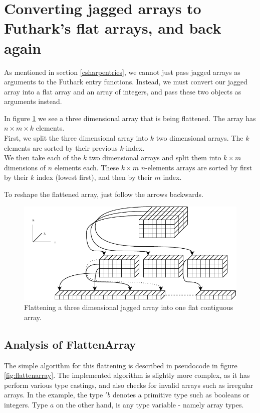 \section{Converting jagged arrays to Futhark's flat arrays,  and back again}
\label{sec:convertingarrays}
As mentioned in section \ref{csharpentries}, we cannot just pass jagged arrays
as arguments to the Futhark \csharp{} entry functions.
Instead, we must convert our jagged array into a flat array and an array of
integers, and pass these two objects as arguments instead.

In figure \ref{fig:jaggedtoflat} we see a three dimensional array that is being
flattened. The array has $n \times m \times k$ elements.
\\
First, we split the three dimensional array into $k$ two dimensional arrays. The
$k$ elements are sorted by their previous $k$-index.
\\
We then take each of the $k$ two dimensional arrays and split them into $k
\times m$ dimensions of $n$ elements each.
These $k \times m$ $n$-elements arrays are sorted by first by their $k$ index
(lowest first), and then by their $m$ index.

To reshape the flattened array, just follow the arrows backwards.

\begin{figure}[H]
  \centering
  \includegraphics[scale=1.4, angle=270]{chapters/figs/jaggedtoflat.pdf}
  \caption{Flattening a three dimensional jagged array into one flat contiguous
    array.}
  \label{fig:jaggedtoflat}
\end{figure}

\subsection{Analysis of FlattenArray}
The simple algorithm for this flattening is described in pseudocode in figure
\ref{fig:flattenarray}. The implemented algorithm is slightly more complex, as
it has perform various type castings, and also checks for invalid arrays such as
irregular arrays.
In the example, the type $'b$ denotes a primitive type such as booleans or
integers. Type $a$ on the other hand, is any type variable \-- namely array
types.

